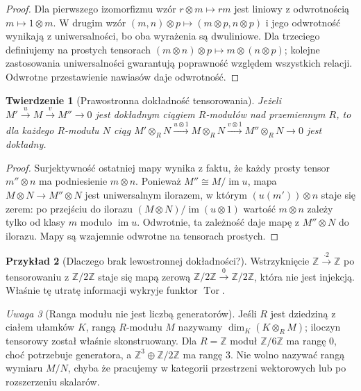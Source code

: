 \documentclass[11pt,a4paper,oneside]{report}
\newcommand{\Z}{\mathbb{Z}}
\theoremstyle{plain}
\newtheorem{twierdzenie}{Twierdzenie}[section]
\theoremstyle{definition}
\newtheorem{przyklad}[twierdzenie]{Przykład}
\theoremstyle{remark}
\newtheorem{uwaga}[twierdzenie]{Uwaga}
\begin{document}
\begin{proof}
Dla pierwszego izomorfizmu wzór $r\otimes m\mapsto rm$
jest liniowy z odwrotnością $m\mapsto1\otimes m$.
W drugim wzór $(m,n)\otimes p\mapsto(m\otimes p,n\otimes p)$
i jego odwrotność wynikają z uniwersalności, bo oba wyrażenia
są dwuliniowe. Dla trzeciego definiujemy na prostych tensorach
$(m\otimes n)\otimes p\mapsto m\otimes(n\otimes p)$;
kolejne zastosowania uniwersalności gwarantują poprawność
względem wszystkich relacji. Odwrotne przestawienie nawiasów
daje odwrotność.
\end{proof}
\begin{twierdzenie}[Prawostronna dokładność tensorowania]
Jeżeli $M'\xrightarrow{u}M\xrightarrow{v}M''\to0$ jest
dokładnym ciągiem $R$-modułów nad przemiennym $R$,
to dla każdego $R$-modułu $N$ ciąg
$M'\otimes_RN\xrightarrow{u\otimes1}M\otimes_RN
\xrightarrow{v\otimes1}M''\otimes_RN\to0$ jest dokładny.
\end{twierdzenie}
\begin{proof}
Surjektywność ostatniej mapy wynika z faktu, że każdy
prosty tensor $m''\otimes n$ ma podniesienie $m\otimes n$.
Ponieważ $M''\cong M/\operatorname{im}u$, mapa $M\otimes N\to
M''\otimes N$ jest uniwersalnym ilorazem, w którym
$(u(m'))\otimes n$ staje się zerem: po przejściu do
ilorazu $(M\otimes N)/\operatorname{im}(u\otimes1)$
wartość $m\otimes n$ zależy tylko od klasy $m$ modulo
$\operatorname{im}u$. Odwrotnie, ta zależność daje mapę
z $M''\otimes N$ do ilorazu. Mapy są wzajemnie odwrotne
na tensorach prostych.
\end{proof}
\begin{przyklad}[Dlaczego brak lewostronnej dokładności?]
Wstrzyknięcie $\Z\xrightarrow{\cdot2}\Z$ po tensorowaniu
z $\Z/2\Z$ staje się mapą zerową
$\Z/2\Z\xrightarrow{0}\Z/2\Z$, która nie jest injekcją.
Właśnie tę utratę informacji wykryje funktor $\operatorname{Tor}$.
\end{przyklad}

\begin{uwaga}[Ranga modułu nie jest liczbą generatorów]
Jeśli $R$ jest dziedziną z ciałem ułamków $K$, rangą $R$-modułu
$M$ nazywamy $\dim_K(K\otimes_R M)$; iloczyn tensorowy
został właśnie skonstruowany. Dla $R=\Z$
moduł $\Z/6\Z$ ma rangę $0$, choć potrzebuje generatora,
a $\Z^3\oplus\Z/2\Z$ ma rangę $3$.
Nie wolno nazywać rangą wymiaru $M/N$, chyba że pracujemy
w kategorii przestrzeni wektorowych lub po rozszerzeniu skalarów.
\end{uwaga}
\end{document}

